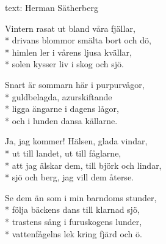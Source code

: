 \begin{SongText}
    \begin{SongInfo}
        text: Herman Sätherberg
    \end{SongInfo}
    \begin{SongVerse}
        Vintern rasat ut bland våra fjällar,\\*%
        drivans blommor smälta bort och dö,\\*%
        himlen ler i vårens ljusa kvällar,\\*%
        solen kysser liv i skog och sjö.
    \end{SongVerse}
    \begin{SongVerse}
        Snart är sommarn här i purpurvågor,\\*%
        guldbelagda, azurskiftande\\*%
        ligga ängarne i dagens lågor,\\*%
        och i lunden dansa källarne.
    \end{SongVerse}
    \begin{SongVerse}
        Ja, jag kommer! Hälsen, glada vindar,\\*%
        ut till landet, ut till fåglarne,\\*%
        att jag älskar dem, till björk och lindar,\\*%
        sjö och berg, jag vill dem återse.
    \end{SongVerse}
    \begin{SongVerse}
        Se dem än som i min barndoms stunder,\\*%
        följa bäckens dans till klarnad sjö,\\*%
        trastens sång i furuskogens lunder,\\*%
        vattenfågelns lek kring fjärd och ö.
    \end{SongVerse}
\end{SongText}
\newpage